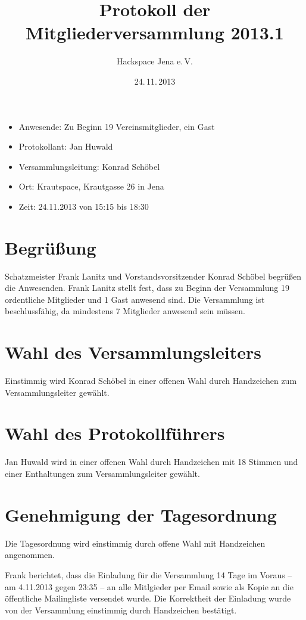 \documentclass{scrartcl}
\title{Protokoll der Mitgliederversammlung 2013.1}
\author{Hackspace Jena e.\,V.}
\date{24.\,11.\,2013}
\begin{document}
\maketitle{}


\begin{itemize}
\item Anwesende: Zu Beginn 19 Vereinsmitglieder, ein Gast
\item Protokollant: Jan Huwald
\item Versammlungsleitung: Konrad Schöbel
\item Ort: Krautspace, Krautgasse 26 in Jena
\item Zeit: 24.11.2013 von 15:15 bis 18:30 %
\end{itemize}

\section{Begrüßung}
Schatzmeister Frank Lanitz und Vorstandsvorsitzender Konrad Schöbel begrüßen die Anwesenden.
Frank Lanitz stellt fest, dass zu Beginn der Versammlung 19 ordentliche
Mitglieder und 1 Gast anwesend sind. Die Versammlung ist beschlussfähig,
da mindestens 7 Mitglieder anwesend sein müssen.

\section{Wahl des Versammlungsleiters}
Einstimmig wird Konrad Schöbel in einer offenen Wahl durch Handzeichen
zum Versammlungsleiter gewählt.

\section{Wahl des Protokollführers}
Jan Huwald wird in einer offenen Wahl durch Handzeichen mit 18
Stimmen und einer Enthaltungen zum Versammlungsleiter gewählt.

\section{Genehmigung der Tagesordnung}
Die Tagesordnung wird einstimmig durch offene Wahl mit Handzeichen
angenommen.

Frank berichtet, dass die Einladung für die Versammlung 14 Tage im
Voraus -- am 4.11.2013 gegen 23:35 -- an alle Mitlgieder per Email
sowie als Kopie an die öffentliche Mailingliste versendet wurde.
Die Korrektheit der Einladung wurde von der
Versammlung einstimmig durch Handzeichen bestätigt.
\end{document}
